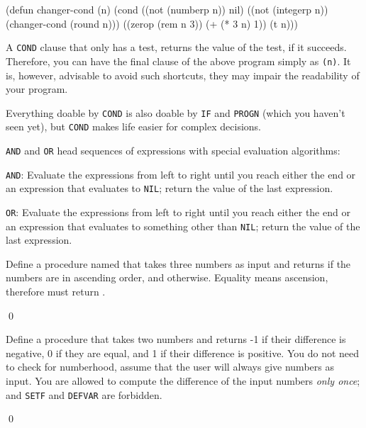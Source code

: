 \documentclass[a4paper,11pt]{article}
\begin{document}
\begin{uenum}
\begin{lispcode}
(defun changer-cond (n)
  (cond ((not (numberp n)) nil)
        ((not (integerp n)) (changer-cond (round n)))
        ((zerop (rem n 3)) (+ (* 3 n) 1))
        (t n)))
\end{lispcode}

\item A \Verb+COND+ clause that only has a test, returns the value of the test, if it succeeds. Therefore, you can have the final clause of the above program simply as \Verb+(n)+. It is, however, advisable to avoid such shortcuts, they may impair the readability of your program. 

\item Everything doable by \Verb+COND+ is also doable by \Verb+IF+ and \Verb+PROGN+ (which you haven't seen yet), but \Verb+COND+ makes life easier for complex decisions.  

\item \Verb+AND+ and \Verb+OR+ head sequences of expressions with special evaluation algorithms:
\begin{uenumi}
\item \Verb+AND+: Evaluate the expressions from left to right until you reach either the end or an expression that evaluates to \Verb+NIL+; return the value of the last expression.
\item \Verb+OR+: Evaluate the expressions from left to right until you reach either the end or an expression that evaluates to something other than \Verb+NIL+; return the value of the last expression.
\end{uenumi}

\end{uenum}

\noindent\hrulefill

\begin{uexercise}
Define a procedure named  that takes three numbers as
input and returns  if the numbers are in ascending order, and
 otherwise. Equality means ascension, therefore
 must return .

\qed
\end{uexercise}

\begin{uexercise}
\label{diff}
Define a procedure that takes two numbers and returns -1 if their difference is negative, 0 if they are equal, and 1 if their difference is positive. You do not need to check for numberhood, assume that the user will always give numbers as input. You are allowed to compute the difference of the input numbers \emph{only once}; and \Verb+SETF+ and \Verb+DEFVAR+ are forbidden.

\qed
\end{uexercise}
\end{document}
